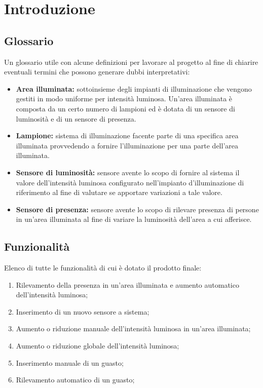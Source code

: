 \chapter{Introduzione}

\section{Glossario}
Un glossario utile con alcune definizioni per lavorare al progetto al fine di chiarire eventuali termini che possono generare
dubbi interpretativi:
\begin{itemize}
    \item \textbf{Area illuminata:} sottoinsieme degli impianti di illuminazione che vengono gestiti in
modo uniforme per intensità luminosa. Un'area illuminata è composta da un certo numero di lampioni ed è dotata di un sensore 
di luminosità e di un sensore di presenza.
    \item \textbf{Lampione:} sistema di illuminazione facente parte di una specifica area illuminata provvedendo a fornire 
    l'illuminazione per una parte dell'area illuminata.
    \item \textbf{Sensore di luminosità:} sensore avente lo scopo di fornire al sistema il valore dell'intensità luminosa 
    configurato nell'impianto d'illuminazione di riferimento al fine di valutare se apportare variazioni a tale valore.
    \item \textbf{Sensore di presenza:} sensore avente lo scopo di rilevare presenza di persone in un'area illuminata al fine 
    di variare la luminosità dell'area a cui afferisce.
\end{itemize}

\section{Funzionalità}
Elenco di tutte le funzionalità di cui è dotato il prodotto finale:
\begin{enumerate}
    \item Rilevamento della presenza in un'area illuminata e aumento automatico dell'intensità luminosa;
    \item Inserimento di un nuovo sensore a sistema;
    \item Aumento o riduzione manuale dell'intensità luminosa in un'area illuminata;
    \item Aumento o riduzione globale dell'intensità luminosa;
    \item Inserimento manuale di un guasto;
    \item Rilevamento automatico di un guasto;
\end{enumerate}

